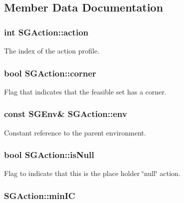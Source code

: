 \subsection{Member Data Documentation}
\hypertarget{classSGAction_a65c62a3804b50febd9a289f3d8902f85}{
\subsubsection[{action}]{\setlength{\rightskip}{0pt plus 5cm}int S\-G\-Action\-::action\hspace{0.3cm}{\ttfamily [protected]}}}\label{classSGAction_a65c62a3804b50febd9a289f3d8902f85}
The index of the action profile. \hypertarget{classSGAction_accae7581737b79cbe61c2b902a25d6cf}{
\subsubsection[{corner}]{\setlength{\rightskip}{0pt plus 5cm}bool S\-G\-Action\-::corner\hspace{0.3cm}{\ttfamily [protected]}}}\label{classSGAction_accae7581737b79cbe61c2b902a25d6cf}
Flag that indicates that the feasible set has a corner. \hypertarget{classSGAction_a5ae60f6fd5a545d13c8a2525d7378b9d}{
\subsubsection[{env}]{\setlength{\rightskip}{0pt plus 5cm}const {\bf S\-G\-Env}\& S\-G\-Action\-::env\hspace{0.3cm}{\ttfamily [protected]}}}\label{classSGAction_a5ae60f6fd5a545d13c8a2525d7378b9d}
Constant reference to the parent environment. \hypertarget{classSGAction_a57b045c64bb537b920ce4065f214c5f6}{
\subsubsection[{is\-Null}]{\setlength{\rightskip}{0pt plus 5cm}bool S\-G\-Action\-::is\-Null\hspace{0.3cm}{\ttfamily [protected]}}}\label{classSGAction_a57b045c64bb537b920ce4065f214c5f6}
Flag to indicate that this is the place holder \char`\"{}null\char`\"{} action. \hypertarget{classSGAction_a20b96be3274e3cd2bc1be0d218fc2b06}{
\subsubsection[{min\-I\-C}]{ S\-G\-Action\-::min\-I\-C\hspace{0.3cm}{\ttfamily [protected]}}}\label{classSGAction_a20b96be3274e3cd2bc1be0d218fc2b06}
